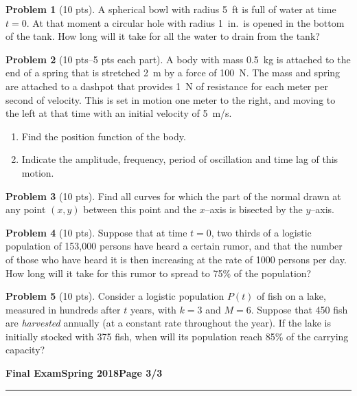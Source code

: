 \documentclass[12pt]{article}
\theoremstyle{definition}
\newtheorem{problem}{Problem}
\begin{document}
\begin{problem}[10 pts]
A spherical bowl with radius 5~ft is full of water at time $t=0$.  At that moment a circular hole with radius 1~in.~is opened in the bottom of the tank.  How long will it take for all the water to drain from the tank?
\end{problem}

\begin{problem}[10 pts--5 pts each part]
A body with mass 0.5~kg is attached to the end of a spring that is stretched 2~m by a force of 100~N.  The mass and spring are attached to a dashpot that provides 1~N of resistance for each meter per second of velocity.  This is set in motion one meter to the right, and moving to the left at that time with an initial velocity of 5~m/s.
\begin{enumerate}
  \item Find the position function of the body.
  \item Indicate the amplitude, frequency, period of oscillation and time lag of this motion.
\end{enumerate}
\end{problem}

\begin{problem}[10 pts]
Find all curves for which the part of the normal drawn at any point $(x,y)$ between this point and the $x$--axis is bisected by the $y$--axis.
\end{problem}

\begin{problem}[10 pts]
Suppose that at time $t=0$, two thirds of a logistic population of 153,000 persons have heard a certain rumor, and that the number of those who have heard it is then increasing­ at the rate of 1000 persons per day. How long will it take for this rumor to spread to 75\% of the population?
\end{problem}

\begin{problem}[10 pts]
Consider a logistic population $P(t)$ of fish on a lake, measured in hundreds after $t$ years, with $k=3$ and $M=6$.  Suppose that 450 fish are \emph{harvested} annually (at a constant rate throughout the year).  If the lake is initially stocked with 375 fish, when will its population reach 85\% of the carrying capacity?
\end{problem}

\newpage

\hfill{\large\bf Final Exam}\hfill{\large\bf Spring 2018}\hfill{\large\bf Page 3/3}\hrule
\end{document}
